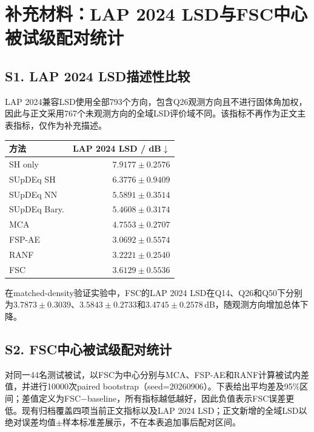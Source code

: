 \documentclass[UTF8,a4paper]{article}
\begin{document}
\section*{补充材料：LAP 2024 LSD与FSC中心被试级配对统计}

\subsection*{S1. LAP 2024 LSD描述性比较}
LAP 2024兼容LSD使用全部793个方向，包含Q26观测方向且不进行固体角加权，因此与正文采用767个未观测方向的全域LSD评价域不同。该指标不再作为正文主表指标，仅作为补充描述。

\begin{table}[htbp]
\centering\small
\begin{tabular}{lr}
\toprule
方法 & LAP 2024 LSD / dB$\downarrow$ \\
\midrule
SH only & $7.9177 \pm 0.2576$ \\
SUpDEq SH & $6.3776 \pm 0.9409$ \\
SUpDEq NN & $5.5891 \pm 0.3514$ \\
SUpDEq Bary. & $5.4608 \pm 0.3174$ \\
MCA & $4.7553 \pm 0.2707$ \\
FSP-AE & $\mathbf{3.0692} \pm 0.5574$ \\
RANF & $3.2221 \pm 0.2540$ \\
FSC & $3.6129 \pm 0.5536$ \\
\bottomrule
\end{tabular}
\end{table}

在matched-density验证实验中，FSC的LAP 2024 LSD在Q14、Q26和Q50下分别为$3.7873\pm0.3039$、$3.5843\pm0.2733$和$3.4745\pm0.2578$\,dB，随观测方向增加总体下降。

\subsection*{S2. FSC中心被试级配对统计}
对同一44名测试被试，以FSC为中心分别与MCA、FSP-AE和RANF计算被试内差值，并进行10000次paired bootstrap（seed=20260906）。下表给出平均差及95\%区间；差值定义为FSC$-$baseline，所有指标越低越好，因此负值表示FSC误差更低。现有归档覆盖四项当前正文指标以及LAP 2024 LSD；正文新增的全域LSD以绝对误差均值$\pm$样本标准差展示，不在本表追加事后配对区间。
\end{document}
